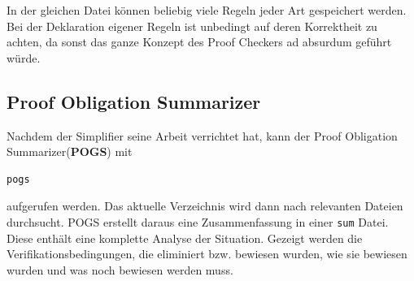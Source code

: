 In der gleichen Datei können beliebig viele Regeln jeder Art gespeichert werden.
Bei der Deklaration eigener Regeln ist unbedingt auf deren Korrektheit zu achten, da sonst das ganze Konzept des Proof Checkers ad absurdum geführt würde.

\subsection{Proof Obligation Summarizer}
Nachdem der Simplifier seine Arbeit verrichtet hat, kann der Proof Obligation Summarizer(\textbf{POGS}) mit
\begin{verbatim}
pogs
\end{verbatim}
aufgerufen werden. Das aktuelle Verzeichnis wird dann nach relevanten Dateien durchsucht. POGS erstellt daraus eine Zusammenfassung in einer \texttt{sum} Datei. Diese enthält eine komplette Analyse der Situation. Gezeigt werden die Verifikationsbedingungen, die eliminiert bzw. bewiesen wurden, wie sie bewiesen wurden und was noch bewiesen werden muss.